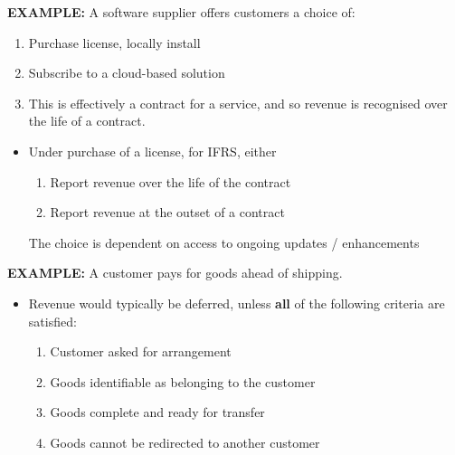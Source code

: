 \documentclass[../notes_compiled.tex]{subfiles}
\begin{document}
\begin{itemize}
{}
{\color{RedViolet}
\item[] \textbf{EXAMPLE:} A software supplier offers customers a choice of:
\begin{enumerate}
\item Purchase license, locally install
\item Subscribe to a cloud-based solution
\item[] This is effectively a contract for a service, and so revenue is recognised over the life of a contract.
\end{enumerate}
}
{\color{RoyalBlue}
\begin{itemize}
\item Under purchase of a license, for IFRS, either
\begin{enumerate}
\item Report revenue over the life of the contract
\item Report revenue at the outset of a contract
\end{enumerate}
The choice is dependent on access to ongoing updates / enhancements
\end{itemize}
}
{\color{RedViolet}
\item[] \textbf{EXAMPLE:} A customer pays for goods ahead of shipping.
}
{\color{RoyalBlue}
\begin{itemize}
\item Revenue would typically be deferred, unless \textbf{all} of the following criteria are satisfied:
\begin{enumerate}
\item Customer asked for arrangement
\item Goods identifiable as belonging to the customer
\item Goods complete and ready for transfer
\item Goods cannot be redirected to another customer
\end{enumerate}
\end{itemize}
}
\end{itemize}
\end{document}
